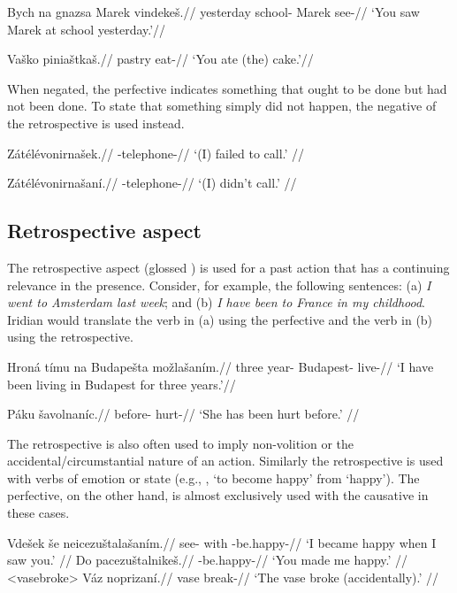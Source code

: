 \pex
\begingl
\gla Bych na gnazsa Marek vindeke\v{s}.//
\glb yesterday  school- Marek see-//
\glft `You saw Marek at school yesterday.'//
\endgl
\xe

\pex
\begingl
\gla Va\v{s}ko pinia\v{s}tka\v{s}.//
\glb pastry eat-//
\glft `You ate (the) cake.'//
\endgl
\xe


\par When negated, the perfective indicates something that ought to be done but had not been done. To state that something simply did not happen, the negative of the retrospective is used instead.

\pex
\begingl
\gla Z\'at\'el\'evonirna\v{s}ek.//
\glb {}-telephone-//
\glft `(I) failed to call.' //
\endgl
\xe

\pex
\begingl
\gla Z\'at\'el\'evonirna\v{s}an\'i.//
\glb {}-telephone-//
\glft `(I) didn't call.' //
\endgl
\xe

\subsection{Retrospective aspect}
\par The retrospective aspect (glossed ) is used for a past action that has a continuing relevance in the presence. Consider, for example, the following sentences: (a) \textit{I went to Amsterdam last week}; and (b) \textit{I have been to France in my childhood}. Iridian would translate the verb in (a) using the perfective and the verb in (b) using the retrospective.

\begingl
\gla Hroná tímu na Budape\v{s}ta mo\v{z}la\v{s}an\'im.//
\glb three year-  Budapest- live-//
\glft `I have been living in Budapest for three years.'//
\endgl
\xe

\begingl
\gla Páku \v{s}avolnan\'ic.//
\glb before- hurt-//
\glft `She has been hurt before.' //
\endgl
\xe

\par The retrospective is also often used to imply non-volition or the  accidental/circumstantial nature of an action. Similarly the retrospective is used with verbs of emotion or state (e.g., , ‘to become happy’ from  ‘happy’). The perfective, on the other hand, is almost exclusively used with the causative in these cases.

\pex
\a	\begingl
\gla Vde\v{s}ek \v{s}e neicezu\v{s}tala\v{s}an\'im.//
\glb see- with -be.happy-//
\glft `I became happy when I saw you.' //
\endgl
\a	\begingl
\gla Do pacezu\v{s}talnike\v{s}.//
\glb {} -be.happy-//
\glft `You made me happy.' //
\endgl
\xe
\pex<vasebroke>
\begingl
\gla Váz noprizan\'i.//
\glb vase break-//
\glft `The vase broke (accidentally).' //
\endgl
\xe

